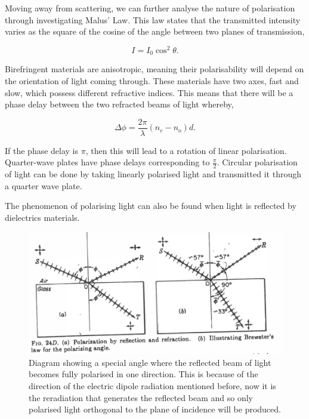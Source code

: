 \documentclass{article}
\begin{document}
Moving away from scattering, we can further analyse the nature of polarisation 
through investigating Malus' Law. This law states that the transmitted intensity 
varies as the square of the cosine of the angle between two planes of transmission,

\begin{equation} \label{eq:malus}
    I = I_0\cos^2{\theta}.
\end{equation}

Birefringent materials are anisotropic, meaning their polarisability will depend 
on the orientation of light coming through. These materials have two axes, fast 
and slow, which possess different refractive indices. This means that there will 
be a phase delay between the two refracted beams of light whereby,

\begin{equation}
    \Delta \phi = \frac{2\pi}{\lambda}(n_e-n_o)d.
\end{equation}

If the phase delay is $\pi$, then this will lead to a rotation of linear polarisation.
Quarter-wave plates have phase delays corresponding to $\frac{\pi}{2}$. Circular 
polarisation of light can be done by taking linearly polarised light and transmitted 
it through a quarter wave plate.

The phenomenon of polarising light can also be found when light is reflected by dielectrics
materials.

\begin{figure}[H]
    \centering
    \includegraphics[scale=0.4]{brewsters.png}
    \caption{Diagram showing a special angle where the reflected beam of light becomes 
    fully polarised in one direction. This is because of the direction of the electric 
    dipole radiation mentioned before, now it is the reradiation that generates the 
    reflected beam and so only polarised light orthogonal to the plane of incidence 
    will be produced.}
    \label{fig:brewsters}
\end{figure}
\end{document}
